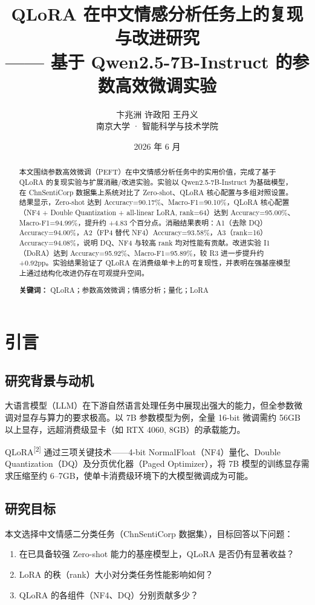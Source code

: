 \documentclass[12pt,a4paper]{article}
\title{\textbf{QLoRA 在中文情感分析任务上的复现与改进研究} \\[0.5em]
\large —— 基于 Qwen2.5-7B-Instruct 的参数高效微调实验}
\author{卞兆洲 \quad 许政阳 \quad 王丹义 \\[0.3em] \normalsize 南京大学 · 智能科学与技术学院}
\date{2026 年 6 月}
\begin{document}
\maketitle

\begin{abstract}
本文围绕参数高效微调（PEFT）在中文情感分析任务中的实用价值，完成了基于 QLoRA 的复现实验与扩展消融/改进实验。实验以 Qwen2.5-7B-Instruct 为基础模型，在 ChnSentiCorp 数据集上系统对比了 Zero-shot、QLoRA 核心配置与多组对照设置。结果显示，Zero-shot 达到 Accuracy=90.17\%、Macro-F1=90.10\%，QLoRA 核心配置（NF4 + Double Quantization + all-linear LoRA, rank=64）达到 Accuracy=95.00\%、Macro-F1=94.99\%，提升约 +4.83 个百分点。消融结果表明：A1（去除 DQ）Accuracy=94.00\%，A2（FP4 替代 NF4）Accuracy=93.58\%，A3（rank=16）Accuracy=94.08\%，说明 DQ、NF4 与较高 rank 均对性能有贡献。改进实验 I1（DoRA）达到 Accuracy=95.92\%、Macro-F1=95.89\%，较 R3 进一步提升约 +0.92pp。实验结果验证了 QLoRA 在消费级单卡上的可复现性，并表明在强基座模型上通过结构化改进仍存在可观提升空间。

\noindent\textbf{关键词：} QLoRA；参数高效微调；情感分析；量化；LoRA
\end{abstract}

\newpage
\tableofcontents
\newpage

\section{引言}

\subsection{研究背景与动机}

大语言模型（LLM）在下游自然语言处理任务中展现出强大的能力，但全参数微调对显存与算力的要求极高。以 7B 参数模型为例，全量 16-bit 微调需约 56GB 以上显存，远超消费级显卡（如 RTX 4060, 8GB）的承载能力。

QLoRA\textsuperscript{[2]} 通过三项关键技术——4-bit NormalFloat（NF4）量化、Double Quantization（DQ）及分页优化器（Paged Optimizer），将 7B 模型的训练显存需求压缩至约 6--7GB，使单卡消费级环境下的大模型微调成为可能。

\subsection{研究目标}

本文选择中文情感二分类任务（ChnSentiCorp 数据集），目标回答以下问题：
\begin{enumerate}[leftmargin=2em]
  \item 在已具备较强 Zero-shot 能力的基座模型上，QLoRA 是否仍有显著收益？
  \item LoRA 的秩（rank）大小对分类任务性能影响如何？
  \item QLoRA 的各组件（NF4、DQ）分别贡献多少？
\end{enumerate}
\end{document}
